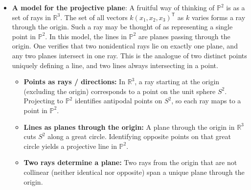 \documentclass{report}
\begin{document}
\begin{itemize}
            \bigbreak \noindent 
            Note how the introduction of the concept of points at infinity serves to simplify the intersection properties of points and lines. In the projective plane $\mathbb{P}^{2}$, one may state without qualification that two distinct lines meet in a single point and two distinct
            \bigbreak \noindent 
            points lie on a single line. This is not true in the standard Euclidean geometry of $\mathbb{R}^{2}$, in which parallel lines form a special case.
            \bigbreak \noindent 
            The study of the geometry of $\mathbb{P}^{2}$ is known as projective geometry. In a coordinate-free purely geometric study of projective geometry, one does not make any distinction between points at infinity (ideal points) and ordinary points. It will, however, serve our purposes in this book sometimes to distinguish between ideal points and non-ideal points. Thus, the line at infinity will at times be considered as a special line in projective space.
        \item \textbf{A model for the projective plane}: 
            A fruitful way of thinking of $\mathbb{P}^{2}$ is as a set of rays in $\mathbb{R}^{3}$. The set of all vectors $k(x_{1}, x_{2}, x_{3})^{\mathsf{T}}$ as $k$ varies forms a ray through the origin.
            \bigbreak \noindent 
            Such a ray may be thought of as representing a single point in $\mathbb{P}^{2}$. In this model, the lines in $\mathbb{P}^{2}$ are planes passing through the origin. One verifies that two nonidentical rays lie on exactly one plane, and any two planes intersect in one ray. This is the analogue of two distinct points uniquely defining a line, and two lines always intersecting in a point.
            \begin{itemize}
                \item \textbf{Points as rays / directions:} In \(\mathbb{R}^{3}\), a ray starting at the origin (excluding the origin) corresponds to a point on the unit sphere \(S^{2}\). Projecting to \(\mathbb{P}^{2}\) identifies antipodal points on \(S^{2}\), so each ray maps to a point in \(\mathbb{P}^{2}\).
                \item \textbf{Lines as planes through the origin:} A plane through the origin in \(\mathbb{R}^{3}\) cuts \(S^{2}\) along a great circle. Identifying opposite points on that great circle yields a projective line in \(\mathbb{P}^{2}\).
                \item \textbf{Two rays determine a plane:} Two rays from the origin that are not collinear (neither identical nor opposite) span a unique plane through the origin.

\end{itemize}
\end{itemize}
\end{document}

